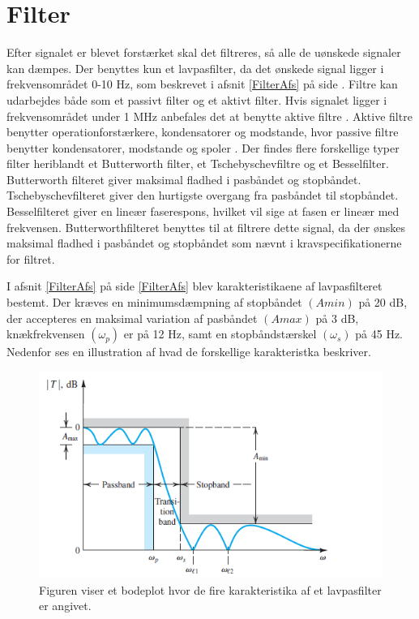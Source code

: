 \section{Filter}
Efter signalet er blevet forstærket skal det filtreres, så alle de uønskede signaler kan dæmpes. Der benyttes kun et lavpasfilter, da det ønskede signal ligger i frekvensområdet 0-10 Hz, som beskrevet i afsnit \ref{FilterAfs} på side \pageref{FilterAfs}. Filtre kan udarbejdes både som et passivt filter og et aktivt filter. Hvis signalet ligger i frekvensområdet under 1 MHz anbefales det at benytte aktive filtre \cite{Op amps for everyone}. Aktive filtre benytter operationforstærkere, kondensatorer og modstande, hvor passive filtre benytter kondensatorer, modstande og spoler \cite{Op amps for everyone}. Der findes flere forskellige typer filter heriblandt et Butterworth filter, et Tschebyschevfiltre og et Besselfilter. Butterworth filteret giver maksimal fladhed i pasbåndet og stopbåndet. Tschebyschevfilteret giver den hurtigste overgang fra pasbåndet til stopbåndet. Besselfilteret giver en lineær faserespons, hvilket vil sige at fasen er lineær med frekvensen. \cite{Op amps for everyone} Butterworthfilteret benyttes til at filtrere dette signal, da der ønskes maksimal fladhed i pasbåndet og stopbåndet som nævnt i kravspecifikationerne for filtret.

I afsnit \ref{FilterAfs} på side \ref{FilterAfs} blev karakteristikaene af lavpasfilteret bestemt. Der kræves en minimumsdæmpning af stopbåndet $(Amin)$ på 20 dB, der accepteres en maksimal variation af pasbåndet $(Amax)$ på 3 dB, knækfrekvensen $(\omega _p)$ er på 12 Hz, samt en stopbåndstærskel $( \omega _s)$ på 45 Hz. Nedenfor ses en illustration af hvad de forskellige karakteristka beskriver.

\begin{figure}[H]
\centering
\includegraphics[scale=1]{figures/cProblemloesning/Lavpasfilter_generisk.PNG}
\caption{Figuren viser et bodeplot hvor de fire karakteristika af et lavpasfilter er angivet.}
\label{fig:lavpasfilter_generisk}
\end{figure} 

